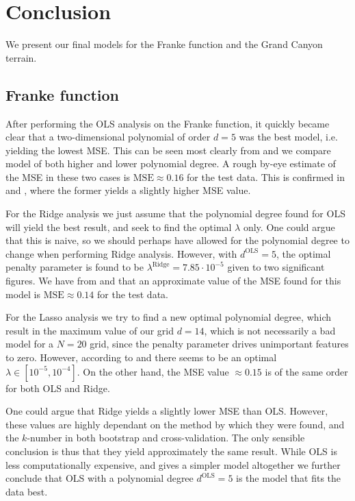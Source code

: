 \section{Conclusion}\label{sec:conclusion}


We present our final models for the Franke function and the Grand Canyon terrain. 


\subsection{Franke function}
 
After performing the OLS analysis on the Franke function, it quickly became clear that a two-dimensional polynomial of order $d=5$ was the best model, i.e. yielding the lowest MSE. This can be seen most clearly from  and  we compare model of both higher and lower polynomial degree. A rough by-eye estimate of the MSE in these two cases is $\mathrm{MSE}\approx 0.16$ for the test data. This is confirmed in  and , where the former yields a slightly higher MSE value. 

For the Ridge analysis we just assume that the polynomial degree found for OLS will yield the best result, and seek to find the optimal $\lambda$ only. One could argue that this is naive, so we should perhaps have allowed for the polynomial degree to change when performing Ridge analysis. However, with $d^\text{OLS}=5$, the optimal penalty parameter is found to be $\lambda^\mathrm{Ridge} = 7.85\cdot10^{-5}$ given to two significant figures. We have from  and  that an approximate value of the MSE found for this model is $\mathrm{MSE} \approx 0.14$ for the test data. 

For the Lasso analysis we try to find a new optimal polynomial degree, which result in the maximum value of our grid $d=14$, which is not necessarily a bad model for a $N=20$ grid, since the penalty parameter drives unimportant features to zero. However, according to  and  there seems to be an optimal $\lambda\in[10^{-5}, 10^{-4}]$. On the other hand, the MSE value $\approx 0.15$ is of the same order for both OLS and Ridge. 

One could argue that Ridge yields a slightly lower MSE than OLS. However, these values are highly dependant on the method by which they were found, and the $k$-number in both bootstrap and cross-validation. The only sensible conclusion is thus that they yield approximately the same result. While OLS is less computationally expensive, and gives a simpler model altogether we further conclude that OLS with a polynomial degree $d^\text{OLS}=5$ is the model that fits the data best. 

